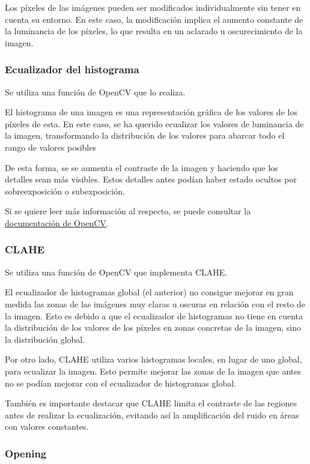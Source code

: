 \documentclass[12pt]{article}
\begin{document}
Los píxeles de las imágenes pueden ser modificados individualmente sin tener en cuenta su entorno. En este caso, la modificación implica el aumento constante de la luminancia de los píxeles, lo que resulta en un aclarado u oscurecimiento de la imagen.

\subsubsection*{Ecualizador del histograma}

Se utiliza una función de OpenCV que lo realiza.

El histograma de una imagen es una representación gráfica de los valores de los píxeles de esta. En este caso, se ha querido ecualizar los valores de luminancia de la imagen, transformando la distribución de los valores para abarcar todo el rango de valores posibles

De esta forma, se se aumenta el contraste de la imagen y haciendo que los detalles sean más visibles. Estos detalles antes podían haber estado ocultos por sobreexposición o subexposición.

Si se quiere leer más información al respecto, se puede consultar la \href{https://docs.opencv.org/3.4/d4/d1b/tutorial_histogram_equalization.html}{documentación de OpenCV}.

\subsubsection*{CLAHE}

Se utiliza una función de OpenCV que implementa CLAHE.

El ecualizador de histogramas global (el anterior) no consigue mejorar en gran medida las zonas de las imágenes muy claras u oscuras en relación con el resto de la imagen. Esto es debido a que el ecualizador de histogramas no tiene en cuenta la distribución de los valores de los píxeles en zonas concretas de la imagen, sino la distribución global.

Por otro lado, CLAHE utiliza varios histogramas locales, en lugar de uno global, para ecualizar la imagen. Esto permite mejorar las zonas de la imagen que antes no se podían mejorar con el ecualizador de histogramas global.

También es importante destacar que CLAHE limita el contraste de las regiones antes de realizar la ecualización, evitando así la amplificación del ruido en áreas con valores constantes.

\subsubsection*{Opening}
\end{document}
